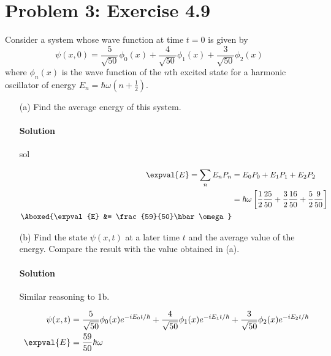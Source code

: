 \documentclass{article}
\begin{document}
\clearpage
	
	\section*{Problem 3: Exercise 4.9}
	
	Consider a system whose wave function at time $t=0$ is given by
	\begin{equation}
		\psi(x,0) = \frac{5}{\sqrt{50}} \phi_0 (x) + \frac{4}{\sqrt{50}} \phi_1 (x) + \frac{3}{\sqrt{50}} \phi_2 (x) \label{eq:3}
	\end{equation}
	where $\phi_n (x)$ is the wave function of the $n\text{th}$ excited state for a harmonic oscillator of energy $E_n = \hbar\omega\left( n + \frac{1}{2} \right)$.
	\begin{enumerate}
		\item[(a)] Find the average energy of this system.
		\paragraph{Solution} sol
		
		\begin{equation}
			\begin{split}
				\expval{E} = \sum_{n} E_n P_n &= E_0 P_0 + E_1 P_1 + E_2 P_2 \\
				&= \hbar\omega \left[ \frac{1}{2} \frac{25}{50} + \frac{3}{2} \frac{16}{50} + \frac{5}{2} \frac{9}{50} \right] \\
				\Aboxed{\expval{E} &= \frac{59}{50}\hbar\omega}
			\end{split}
		\end{equation}
		
		\item[(b)] Find the state $\psi(x,t)$ at a later time $t$ and the average value of the energy. Compare the result with the value obtained in (a). 
		\paragraph{Solution} Similar reasoning to 1b.
		
		\begin{equation}
			\begin{split}
				\psi(x,t) &= \frac{5}{\sqrt{50}} \phi_0 (x) e^{-i E_0 t/\hbar} + \frac{4}{\sqrt{50}} \phi_1 (x) e^{-i E_1 t/\hbar} + \frac{3}{\sqrt{50}} \phi_2 (x) e^{-i E_2 t/\hbar} \\
				\expval{E} &= \frac{59}{50}\hbar\omega
			\end{split}
		\end{equation}
		

\end{enumerate}
\end{document}
